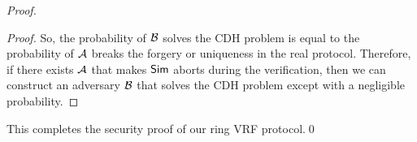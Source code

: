 \begin{proof}
\begin{proof}
			So, the probability of $ \mathcal{B} $ solves the CDH problem is equal to the probability of $ \mathcal{A} $ breaks the forgery or uniqueness in the real protocol. Therefore,  if there exists $ \mathcal{A} $ that makes $ \mathsf{Sim}$ aborts during the verification, then we can construct an adversary $ \mathcal{B} $ that solves the CDH problem except with a negligible probability.
			
			
				  
		\end{proof}
		This completes the security proof of our ring VRF protocol.\qed
	\end{proof}

